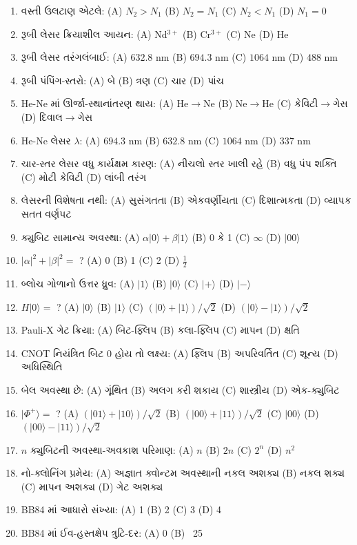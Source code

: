 \begin{enumerate}[label=\textbf{\arabic*.}]
  \item વસ્તી ઉલટાણ એટલે: (A) $N_2>N_1$ (B) $N_2=N_1$ (C) $N_2<N_1$ (D) $N_1=0$
  \item રૂબી લેસર ક્રિયાશીલ આયન: (A) Nd$^{3+}$ (B) Cr$^{3+}$ (C) Ne (D) He
  \item રૂબી લેસર તરંગલંબાઈ: (A) $632.8$ nm (B) $694.3$ nm (C) $1064$ nm (D) $488$ nm
  \item રૂબી પંપિંગ-સ્તરો: (A) બે (B) ત્રણ (C) ચાર (D) પાંચ
  \item He-Ne માં ઊર્જા-સ્થાનાંતરણ થાય: (A) He$\to$Ne (B) Ne$\to$He (C) કેવિટી$\to$ગેસ (D) દિવાલ$\to$ગેસ
  \item He-Ne લેસર $\lambda$: (A) $694.3$ nm (B) $632.8$ nm (C) $1064$ nm (D) $337$ nm
  \item ચાર-સ્તર લેસર વધુ કાર્યક્ષમ કારણ: (A) નીચલો સ્તર ખાલી રહે (B) વધુ પંપ શક્તિ (C) મોટી કેવિટી (D) લાંબી તરંગ
  \item લેસરની વિશેષતા નથી: (A) સુસંગતતા (B) એકવર્ણીયતા (C) દિશાત્મકતા (D) વ્યાપક સતત વર્ણપટ
  \item ક્યુબિટ સામાન્ય અવસ્થા: (A) $\alpha|0\rangle+\beta|1\rangle$ (B) 0 કે 1 (C) $\infty$ (D) $|00\rangle$
  \item $|\alpha|^{2}+|\beta|^{2}=$ ? (A) 0 (B) 1 (C) 2 (D) $\tfrac12$
  \item બ્લોચ ગોળાનો ઉત્તર ધ્રુવ: (A) $|1\rangle$ (B) $|0\rangle$ (C) $|+\rangle$ (D) $|-\rangle$
  \item $H|0\rangle=$ ? (A) $|0\rangle$ (B) $|1\rangle$ (C) $(|0\rangle+|1\rangle)/\sqrt2$ (D) $(|0\rangle-|1\rangle)/\sqrt2$
  \item Pauli-X ગેટ ક્રિયા: (A) બિટ-ફ્લિપ (B) કલા-ફ્લિપ (C) માપન (D) ક્ષતિ
  \item CNOT નિયંત્રિત બિટ 0 હોય તો લક્ષ્ય: (A) ફ્લિપ (B) અપરિવર્તિત (C) શૂન્ય (D) અધિસ્થિતિ
  \item બેલ અવસ્થા છે: (A) ગૂંથિત (B) અલગ કરી શકાય (C) શાસ્ત્રીય (D) એક-ક્યુબિટ
  \item $|\Phi^{+}\rangle=$ ? (A) $(|01\rangle+|10\rangle)/\sqrt2$ (B) $(|00\rangle+|11\rangle)/\sqrt2$ (C) $|00\rangle$ (D) $(|00\rangle-|11\rangle)/\sqrt2$
  \item $n$ ક્યુબિટની અવસ્થા-અવકાશ પરિમાણ: (A) $n$ (B) $2n$ (C) $2^{n}$ (D) $n^{2}$
  \item નો-ક્લોનિંગ પ્રમેય: (A) અજ્ઞાત ક્વોન્ટમ અવસ્થાની નકલ અશક્ય (B) નકલ શક્ય (C) માપન અશક્ય (D) ગેટ અશક્ય
  \item BB84 માં આધારો સંખ્યા: (A) 1 (B) 2 (C) 3 (D) 4
  \item BB84 માં ઈવ-હસ્તક્ષેપ ત્રુટિ-દર: (A) 0 (B) ~25%

\end{enumerate}
